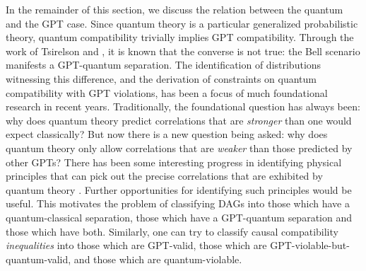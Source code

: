 {%

In the remainder of this section, we discuss the relation between the quantum and the GPT case. Since quantum theory is a particular generalized probabilistic theory, quantum compatibility trivially implies GPT compatibility. Through the work of Tsirelson \cite{Tsirelson1980} and \citet{PROriginal}, it is known that the converse is not true: the Bell scenario manifests a GPT-quantum separation.  The identification of distributions witnessing this difference, and the derivation of constraints on quantum compatibility with GPT violations, has been a focus of much foundational research in recent years. Traditionally, the foundational question has always been: why does quantum theory predict correlations that are {\em stronger} than one would expect classically?  But now there is a new question being asked: why does quantum theory only allow correlations that are {\em weaker} than those predicted by other GPTs?  There has been some interesting progress in identifying physical principles that can pick out the precise correlations that are exhibited by quantum theory \cite{PopescuReviewNatureComm,ScaraniML,Rohrlich2014,InfoCausArXiv,LONatureComm,LOExploring,EPNBody,barnum2014interference,AlmostQuantum}.  Further opportunities for identifying such principles would be useful.  This motivates the problem of classifying DAGs into those which have a quantum-classical separation, those which have a GPT-quantum separation and those which have both. Similarly, one can try to classify causal compatibility \emph{inequalities} into those which are GPT-valid, those which are GPT-violable-but-quantum-valid, and those which are quantum-violable. 

}
